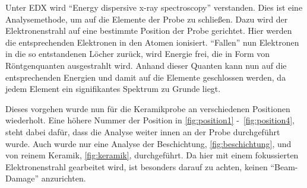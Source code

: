 \documentclass[12pt,english,ngerman]{scrartcl}
\begin{document}
Unter EDX wird ``Energy dispersive x-ray spectroscopy'' verstanden. Dies ist
eine Analysemethode, um auf die Elemente der Probe zu schließen. Dazu wird der
Elektronenstrahl auf eine bestimmte Position der Probe gerichtet. Hier werden
die entsprechenden Elektronen in den Atomen ionisiert. ``Fallen'' nun
Elektronen in die so entstandenen Löcher zurück, wird Energie frei, die in Form
von Röntgenquanten ausgestrahlt wird. Anhand dieser Quanten kann nun auf die
entsprechenden Energien und damit auf die Elemente geschlossen werden, da jedem
Element ein signifikantes Spektrum zu Grunde liegt.

Dieses vorgehen wurde nun für die Keramikprobe an verschiedenen Positionen
wiederholt. Eine höhere Nummer der Position in \autoref{fig:position1}
-~\ref{fig:position4}, steht dabei dafür, dass die Analyse weiter innen an der
Probe durchgeführt wurde. Auch wurde nur eine Analyse der Beschichtung,
\autoref{fig:beschichtung}, und von reinem Keramik, \autoref{fig:keramik},
durchgeführt. Da hier mit einem fokussierten Elektronenstrahl gearbeitet wird,
ist besonders darauf zu achten, keinen ``Beam-Damage'' anzurichten.
\end{document}
